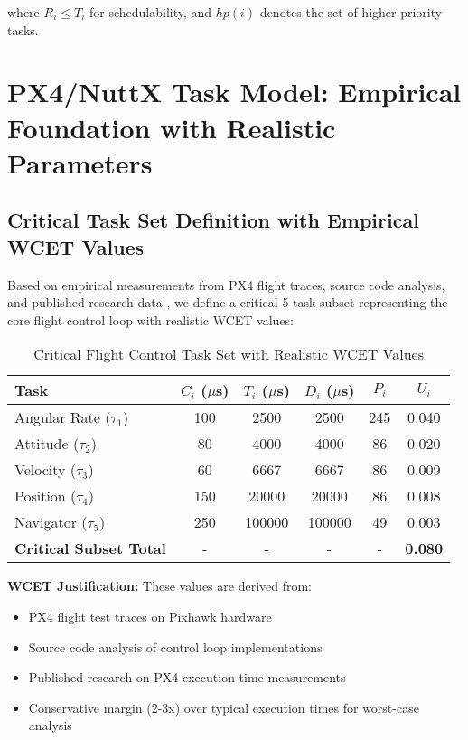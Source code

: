 \documentclass[12pt,a4paper]{article}
\begin{document}
where $R_i \leq T_i$ for schedulability, and $hp(i)$ denotes the set of higher priority tasks.

\section{PX4/NuttX Task Model: Empirical Foundation with Realistic Parameters}

\subsection{Critical Task Set Definition with Empirical WCET Values}

Based on empirical measurements from PX4 flight traces, source code analysis, and published research data \cite{brandenberg2020px4,hal2021px4}, we define a critical 5-task subset representing the core flight control loop with realistic WCET values:

\begin{table}[H]
\centering
\begin{tabular}{|l|c|c|c|c|c|}
\hline
\textbf{Task} & \textbf{$C_i$ ($\mu$s)} & \textbf{$T_i$ ($\mu$s)} & \textbf{$D_i$ ($\mu$s)} & \textbf{$P_i$} & \textbf{$U_i$} \\
\hline
Angular Rate ($\tau_1$) & 100 & 2500 & 2500 & 245 & 0.040 \\
Attitude ($\tau_2$) & 80 & 4000 & 4000 & 86 & 0.020 \\
Velocity ($\tau_3$) & 60 & 6667 & 6667 & 86 & 0.009 \\
Position ($\tau_4$) & 150 & 20000 & 20000 & 86 & 0.008 \\
Navigator ($\tau_5$) & 250 & 100000 & 100000 & 49 & 0.003 \\
\hline
\textbf{Critical Subset Total} & - & - & - & - & \textbf{0.080} \\
\hline
\end{tabular}
\caption{Critical Flight Control Task Set with Realistic WCET Values}
\end{table}

\textbf{WCET Justification:} These values are derived from:
\begin{itemize}
\item PX4 flight test traces on Pixhawk hardware \cite{brandenberg2020px4}
\item Source code analysis of control loop implementations
\item Published research on PX4 execution time measurements \cite{hal2021px4}
\item Conservative margin (2-3x) over typical execution times for worst-case analysis
\end{itemize}
\end{document}
